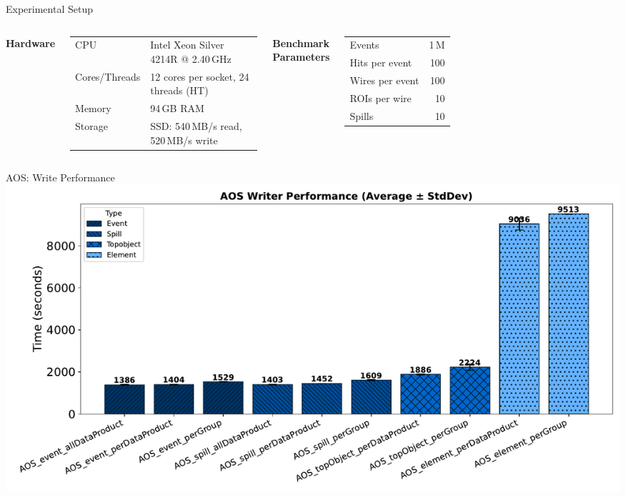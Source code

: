 \documentclass[aspectratio=169]{beamer}
\begin{document}
\begin{frame}{Experimental Setup}
\footnotesize
\begin{columns}[t,onlytextwidth]
  \textbf{Hardware}\\
  \vspace{1em}
  \begin{tabular}{@{}l p{0.68\linewidth}@{}}
  CPU & Intel Xeon Silver 4214R @ 2.40\,GHz \\
  Cores/Threads & 12 cores per socket, 24 threads (HT) \\
  Memory & 94\,GB RAM \\
  Storage & SSD: 540\,MB/s read, 520\,MB/s write \\
  \end{tabular}

  \textbf{Benchmark Parameters}\\
  \vspace{1em}
  \begin{tabular}{@{}l r@{}}
  Events & 1\,M \\
  Hits per event & 100 \\
  Wires per event & 100 \\
  ROIs per wire & 10 \\
  Spills & 10 \\
  \end{tabular}
\end{columns}
\end{frame}

\begin{frame}{AOS: Write Performance}
  \centering
  \includegraphics[width=0.9\linewidth]{../experiments/Seaborn/AOSWriter_blue_shaded.pdf}
\end{frame}
\end{document}
